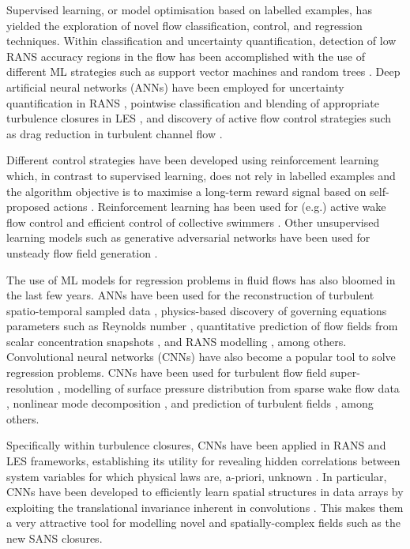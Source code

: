 \documentclass[../main.tex]{subfiles}
\begin{document}
Supervised learning, or model optimisation based on labelled examples, has yielded the exploration of novel flow classification, control, and regression techniques.
Within classification and uncertainty quantification, detection of low RANS accuracy regions in the flow has been accomplished with the use of different ML strategies such as support vector machines and random trees \citep{Ling2015}.
Deep artificial neural networks (ANNs) have been employed for uncertainty quantification in RANS \citep{Geneva2019}, pointwise classification and blending of appropriate turbulence closures in LES \citep{Maulik2019}, and discovery of active flow control strategies such as drag reduction in turbulent channel flow \citep{Lee1997}.

Different control strategies have been developed using reinforcement learning which, in contrast to supervised learning, does not rely in labelled examples and the algorithm objective is to maximise a long-term reward signal based on self-proposed actions \citep{SuttonBarto2018}. 
Reinforcement learning has been used for (e.g.) active wake flow control \citep{Rabault2019a,Rabault2019b} and efficient control of collective swimmers \citep{Verma2018}.
Other unsupervised learning models such as generative adversarial networks \citep{Goodfellow2014} have been used for unsteady flow field generation \citep{Lee2019}.

The use of ML models for regression problems in fluid flows has also bloomed in the last few years. ANNs have been used for the reconstruction of turbulent spatio-temporal sampled data \citep{Deng2019}, physics-based discovery of governing equations parameters such as Reynolds number \citep{Raissi2019}, quantitative prediction of flow fields from scalar concentration snapshots \citep{Raissi2020}, and RANS modelling \citep{Duraisamy2015,Ling2016,Lapeyre2019}, among others.
Convolutional neural networks (CNNs) have also become a popular tool to solve regression problems.
CNNs have been used for turbulent flow field super-resolution \citep{Fukami2019,Liu2020}, modelling of surface pressure distribution from sparse wake flow data \citep{Ye2020}, nonlinear mode decomposition \citep{Murata2019}, and prediction of turbulent fields \citep{Lapeyre2019,Kim2020b,Kim2020a}, among others. 

Specifically within turbulence closures, CNNs have been applied in RANS \citep{Weatheritt2016} and LES \citep{Gamahara2017,Beck2019} frameworks, establishing its utility for revealing hidden correlations between system variables for which physical laws are, a-priori, unknown \citep{Brenner2019}.
In particular, CNNs have been developed to efficiently learn spatial structures in data arrays by exploiting the translational invariance inherent in convolutions \citep{LeCun1995}.
This makes them a very attractive tool for modelling novel and spatially-complex fields such as the new SANS closures.
\end{document}
